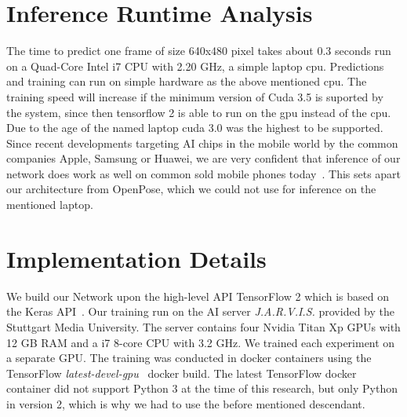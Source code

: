 \section{Inference Runtime Analysis}
The time to predict one frame of size 640x480 pixel takes about 0.3 seconds run on a Quad-Core Intel i7 CPU with 2.20 GHz,
a simple laptop cpu.
Predictions and training can run on simple hardware as the above mentioned cpu.
The training speed will increase if the minimum version of Cuda
3.5 is suported by the system, since then tensorflow 2 is able to run on the gpu instead of the cpu.
Due to the age of the named laptop cuda 3.0 was the highest to be supported.
Since recent developments targeting AI chips in the mobile world by the common companies Apple, Samsung or Huawei,
we are very confident that inference of our network does work as well on common sold mobile phones today~\cite{mobileAI}.
This sets apart our architecture from OpenPose, which we could not use for inference on the mentioned laptop.

\section{Implementation Details}
We build our Network upon the high-level API TensorFlow 2 which is based on the Keras API~\cite{tensorflow2}.
Our training run on the AI server \textit{J.A.R.V.I.S.} provided by the Stuttgart Media University.
The server contains four Nvidia Titan Xp GPUs with 12 GB RAM and a i7 8-core CPU with 3.2 GHz.
We trained each experiment on a separate GPU. The training was conducted in docker containers using the TensorFlow
\textit{latest-devel-gpu}~\cite{tensorflowdocker} docker build.
The latest TensorFlow docker container did not support Python 3 at the time of this research, but only Python in version
2, which is why we had to use the before mentioned descendant.


